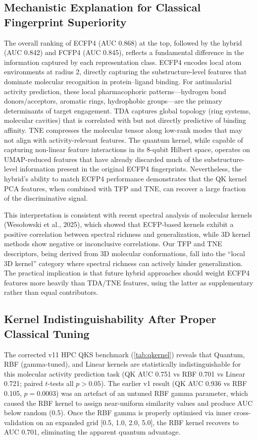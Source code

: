 \documentclass[11pt,a4paper]{article}
\begin{document}
\subsection{Mechanistic Explanation for Classical Fingerprint Superiority}

The overall ranking of ECFP4 (AUC 0.868) at the top, followed by the hybrid (AUC 0.842) and FCFP4 (AUC 0.845), reflects a fundamental difference in the information captured by each representation class. ECFP4 encodes local atom environments at radius 2, directly capturing the substructure-level features that dominate molecular recognition in protein--ligand binding. For antimalarial activity prediction, these local pharmacophoric patterns---hydrogen bond donors/acceptors, aromatic rings, hydrophobic groups---are the primary determinants of target engagement. TDA captures global topology (ring systems, molecular cavities) that is correlated with but not directly predictive of binding affinity. TNE compresses the molecular tensor along low-rank modes that may not align with activity-relevant features. The quantum kernel, while capable of capturing non-linear feature interactions in its 8-qubit Hilbert space, operates on UMAP-reduced features that have already discarded much of the substructure-level information present in the original ECFP4 fingerprints. Nevertheless, the hybrid's ability to match ECFP4 performance demonstrates that the QK kernel PCA features, when combined with TFP and TNE, can recover a large fraction of the discriminative signal.

This interpretation is consistent with recent spectral analysis of molecular kernels (Weso\l{}owski et al., 2025), which showed that ECFP-based kernels exhibit a positive correlation between spectral richness and generalization, while 3D kernel methods show negative or inconclusive correlations. Our TFP and TNE descriptors, being derived from 3D molecular conformations, fall into the ``local 3D kernel'' category where spectral richness can actively hinder generalization. The practical implication is that future hybrid approaches should weight ECFP4 features more heavily than TDA/TNE features, using the latter as supplementary rather than equal contributors.

\subsection{Kernel Indistinguishability After Proper Classical Tuning}

The corrected v11 HPC QKS benchmark (\cref{tab:qkernel}) reveals that Quantum, RBF (gamma-tuned), and Linear kernels are statistically indistinguishable for this molecular activity prediction task (QK AUC 0.751 vs RBF 0.701 vs Linear 0.721; paired $t$-tests all $p > \num{0.05}$). The earlier v1 result (QK AUC 0.936 vs RBF 0.105, $p = \num{0.0003}$) was an artefact of an untuned RBF gamma parameter, which caused the RBF kernel to assign near-uniform similarity values and produce AUC below random (0.5). Once the RBF gamma is properly optimised via inner cross-validation on an expanded grid [0.5, 1.0, 2.0, 5.0], the RBF kernel recovers to AUC 0.701, eliminating the apparent quantum advantage.
\end{document}
